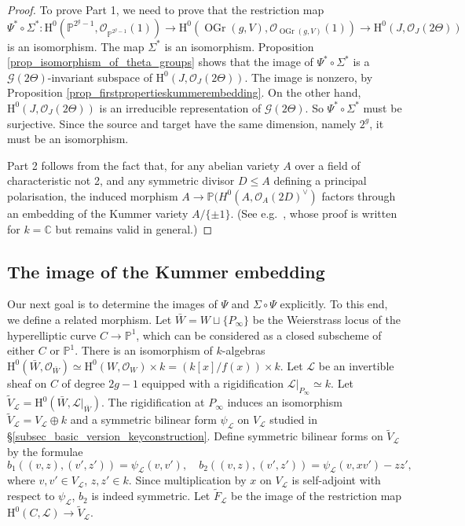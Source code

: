 \documentclass{article} %
\numberwithin{equation}{section}
\newcommand{\sh}[1]{\mathscr{#1}}
\renewcommand{\P}{\mathbb{P}}
\renewcommand{\O}{\mathcal{O}}
\newcommand{\HH}{\mathrm{H}}
\newcommand{\cO}{\mathcal{O}}
\DeclareMathOperator{\OGr}{OGr}
\begin{document}
\begin{proof}
    To prove Part 1, we need to prove that the restriction map 
    \[ \Psi^\ast \circ \Sigma^\ast : \HH^0(\P^{2^g-1}, \O_{\P^{2^g-1}}(1)) \to  \HH^0(\OGr(g, V), \O_{\OGr(g, V)}(1)) \rightarrow \HH^0(J, \O_J(2\Theta)) \]
   is an isomorphism. The map $\Sigma^\ast$ is an isomorphism. Proposition \ref{prop_isomorphism_of_theta_groups} shows that the image of $\Psi^\ast \circ \Sigma^\ast$ is a $\mathcal{G}(2 \Theta)$-invariant subspace of $\HH^0(J, \O_J(2\Theta))$. The image is nonzero, by Proposition \ref{prop_firstpropertieskummerembedding}. On the other hand, $\HH^0(J, \O_J(2\Theta))$ is an irreducible representation of $\mathcal{G}(2 \Theta)$. So $\Psi^\ast \circ \Sigma^\ast$ must be surjective. Since the source and target have the same dimension, namely $2^g$, it must be an isomorphism. 

    Part 2 follows from the fact that, for any abelian variety $A$ over a field of characteristic not 2, and any symmetric divisor $D \leq A$ defining a principal polarisation, the induced morphism $A \to \P(H^0(A, \cO_A(2D)^\vee)$ factors through an embedding of the Kummer variety $A / \{ \pm 1 \}$. (See e.g.\  \cite[Theorem 4.8.1]{BirkenhakeLangeAV}, whose proof is written for $k = \mathbb{C}$ but remains valid in general.)
\end{proof}

\subsection{The image of the Kummer embedding}\label{subsec_image_of_Kummer_embedding}

Our next goal is to determine the images of $\Psi$ and $\Sigma\circ \Psi$ explicitly.
To this end, we define a related morphism.
Let $\bar{W} = W \sqcup \{P_{\infty}\}$ be the Weierstrass locus of the hyperelliptic curve $C\rightarrow \P^1$, which can be considered as a closed subscheme of either $C$ or $\P^1$.
There is an isomorphism of $k$-algebras $\HH^0(\bar{W}, \O_{\bar{W}}) \simeq \HH^0(W, \O_W) \times k =  (k[x]/f(x)) \times k$.
Let $\sh{L}$ be an invertible sheaf on $C$ of degree $2g-1$ equipped with a rigidification $\sh{L}|_{P_{\infty}}\simeq k$.
Let $\tilde{V}_{\sh{L}} = \HH^0(\bar{W},\sh{L}|_{\bar{W}})$.
The rigidification at $P_{\infty}$ induces an isomorphism $\tilde{V}_{\sh{L}}  = V_{\sh{L}} \oplus k$ and a symmetric bilinear form $\psi_{\sh{L}}$ on $V_{\sh{L}}$ studied in \S\ref{subsec_basic_version_keyconstruction}.
Define symmetric bilinear forms on $\tilde{V}_{\sh{L}}$ by the formulae 
\[
b_1((v,z),(v',z')) = \psi_{\sh{L}}(v,v'), \quad b_2((v,z), (v',z')) = \psi_{\sh{L}}(v,xv') - zz',
\]
where $v,v'\in V_{\sh{L}}$, $z,z'\in k$.
Since multiplication by $x$ on $V_{\sh{L}}$ is self-adjoint with respect to $\psi_{\sh{L}}$, $b_2$ is indeed symmetric. 
Let $\tilde{F}_{\sh{L}}$ be the image of the restriction map $\HH^0(C, \sh{L}) \rightarrow \tilde{V}_{\sh{L}}$.
\end{document}
